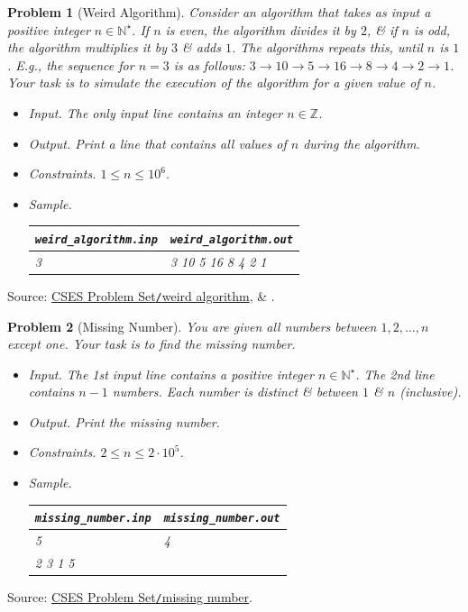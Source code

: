 \documentclass{article}
\newtheorem{problem}{Problem}
\begin{document}
\begin{problem}[Weird Algorithm]
	Consider an algorithm that takes as input a positive integer $n\in\mathbb{N}^\star$. If $n$ is even, the algorithm divides it by $2$, \& if $n$ is odd, the algorithm multiplies it by $3$ \& adds $1$. The algorithms repeats this, until $n$ is $1$. E.g., the sequence for $n = 3$ is as follows: $3\to10\to5\to16\to8\to4\to2\to1$. Your task is to simulate the execution of the algorithm for a given value of $n$.
	\begin{itemize}
		\item {\sf Input.} The only input line contains an integer $n\in\mathbb{Z}$.
		\item {\sf Output.} Print a line that contains all values of $n$ during the algorithm.
		\item {\sf Constraints.} $1\le n\le10^6$.
		\item {\sf Sample.}
		\begin{table}[H]
			\centering
			\begin{tabular}{|l|l|}
				\hline
				\verb|weird_algorithm.inp| & \verb|weird_algorithm.out| \\
				\hline
				3 & 3 10 5 16 8 4 2 1 \\
				\hline
			\end{tabular}
		\end{table}
	\end{itemize}
\end{problem}
Source: \href{https://cses.fi/problemset/task/1068}{CSES Problem Set{\tt/}weird algorithm}, \& \cite[Sect. 1.3, pp. 5--7]{Laaksonen2020}.

\begin{problem}[Missing Number]
	You are given all numbers between $1,2,\ldots,n$ except one. Your task is to find the missing number.
	\begin{itemize}
		\item {\sf Input.} The 1st input line contains a positive integer $n\in\mathbb{N}^\star$. The 2nd line contains $n - 1$ numbers. Each number is distinct \& between $1$ \& $n$ (inclusive).
		\item {\sf Output.} Print the missing number.
		\item {\sf Constraints.} $2\le n\le2\cdot10^5$.
		\item {\sf Sample.}
		\begin{table}[H]
			\centering
			\begin{tabular}{|l|l|}
				\hline
				\verb|missing_number.inp| & \verb|missing_number.out| \\
				\hline
				5 & 4 \\
				2 3 1 5 & \\
				\hline
			\end{tabular}
		\end{table}
	\end{itemize}
\end{problem}
Source: \href{https://cses.fi/problemset/task/1083}{CSES Problem Set{\tt/}missing number}.
\end{document}
